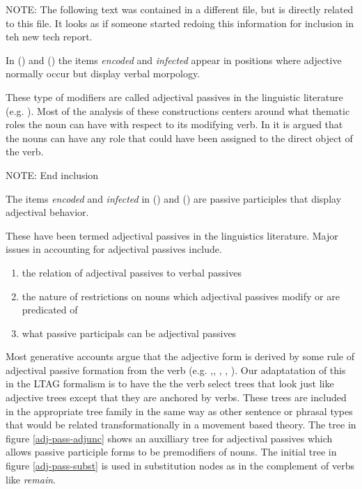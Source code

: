 NOTE:  The following text was contained in a different file, but is directly
related to this file.  It looks as if someone started redoing this information
for inclusion in teh new tech report.

In () and () the items {\it encoded\/} and {\it
infected} appear in positions where adjective normally occur but display verbal
morpology. 


These type of modifiers are called adjectival passives in the
linguistic literature (e.g. \cite{LevinRap}).  Most of the analysis of
these constructions centers around what thematic roles the noun can
have with respect to its modifying verb.  In \cite{LevinRap} it is
argued that the nouns can have any role that could have been assigned
to the direct object of the verb.

NOTE:  End inclusion


  The items {\it  encoded} and {\it infected} in () and () are passive participles that display adjectival behavior.  


These have been termed adjectival passives in the linguistics literature.  Major issues in accounting for adjectival passives include. 

\begin{enumerate}
\item  the relation of adjectival passives to verbal passives
\item  the nature of restrictions on nouns which adjectival passives modify or are predicated of
\item  what passive participals can be adjectival passives
\end{enumerate}

Most generative accounts argue that the adjective form is derived by some rule of adjectival passive formation from the verb (e.g. \cite{Seigel73},\cite{Wasow77}, \cite{Williams81}, \cite{Bresnan82}, \cite{LevinRap}).  Our adaptatation of this in the LTAG formalism is to have the the verb select trees that look just like adjective trees except that they are anchored by verbs.  These trees are included in the appropriate tree family in the same way as other sentence or phrasal types  that would be related transformationally in a movement based theory.   The tree in figure \ref{adj-pass-adjunc} shows an auxilliary tree for adjectival passives which allows passive participle forms to be premodifiers of nouns.  The initial tree in figure \ref{adj-pass-subst} is used in substitution nodes as in the complement of verbs like {\it remain}.

